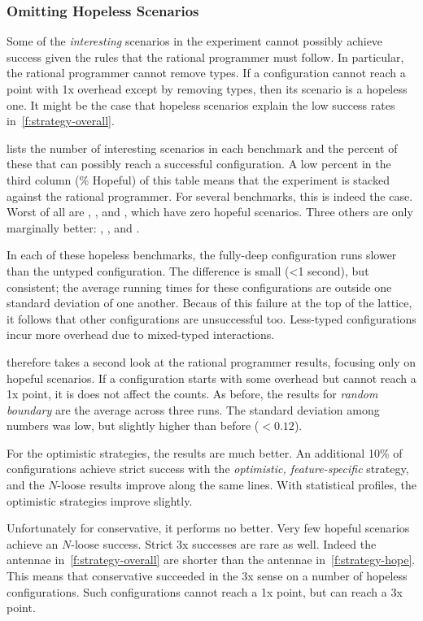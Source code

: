\subsubsection{Omitting Hopeless Scenarios}

Some of the \emph{interesting} scenarios in the experiment cannot possibly
achieve success given the rules that the rational programmer must follow.
In particular, the rational programmer cannot remove types.
If a configuration cannot reach a point with 1x overhead except by removing
types, then its scenario is a hopeless one.
It might be the case that hopeless scenarios explain the low success rates
in~\cref{f:strategy-overall}.

 lists the number of interesting scenarios in each benchmark
and the percent of these that can possibly reach a successful configuration.
A low percent in the third column (\% Hopeful) of this table means that
the experiment is stacked against the rational programmer.
For several benchmarks, this is indeed the case.
Worst of all are , , and ,
which have zero hopeful scenarios.
Three others are only marginally better: , , and
.

In each of these hopeless benchmarks, the fully-deep configuration runs
slower than the untyped configuration.
The difference is small (<1 second), but consistent;
the average running times for these configurations are outside one standard
deviation of one another.
Becaus of this failure at the top of the lattice, it follows that other
configurations are unsuccessful too.
Less-typed configurations incur more overhead due to mixed-typed interactions.

 therefore takes a second look at the rational programmer
results, focusing only on hopeful scenarios.
If a configuration starts with some overhead but cannot reach a 1x point, it
is does not affect the counts.
As before, the results for \emph{random boundary} are the average across three
runs.
The standard deviation among numbers was low, but slightly higher than before ($<0.12$).

For the optimistic strategies, the results are much better.
An additional 10\% of configurations achieve strict success
with the \emph{optimistic, feature-specific} strategy, and
the $N$-loose results improve along the same lines.
With statistical profiles, the optimistic strategies improve
slightly.

Unfortunately for conservative, it performs no better.
Very few hopeful scenarios achieve an $N$-loose success.
Strict 3x successes are rare as well.
Indeed the antennae in~\cref{f:strategy-overall} are shorter than the
antennae in~\cref{f:strategy-hope}.
This means that conservative succeeded in the 3x sense on a number
of hopeless configurations. Such configurations cannot reach a 1x
point, but can reach a 3x point.


